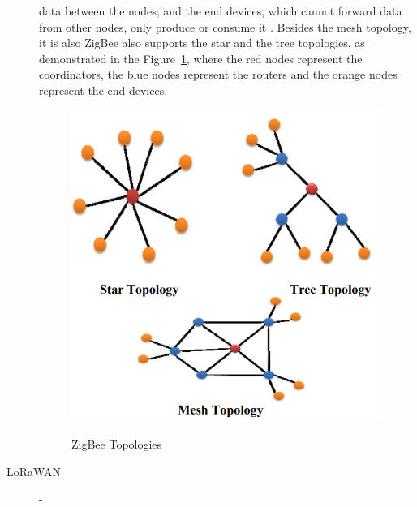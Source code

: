 \begin{description}
            data between the nodes; and the end devices, which cannot forward data from other
            nodes, only produce or consume it \cite{Costa2018, Ramya2011}. Besides the mesh
            topology, it is also ZigBee also supports the star and the tree topologies, as
            demonstrated in the Figure~\ref{fig:zigbee_topologies}, where the red nodes
            represent the coordinators, the blue nodes represent the routers and the orange
            nodes represent the end devices.
            \begin{figure}[H]
                  \caption{ZigBee Topologies \cite{Kaushal2014}}
                  \centering
                  \includegraphics[scale=0.7]{Chapters/Figures/zigbee topologies.png}
                  \label{fig:zigbee_topologies}
            \end{figure}
      \item[\Gls{LoRaWAN}] -

\end{description}
